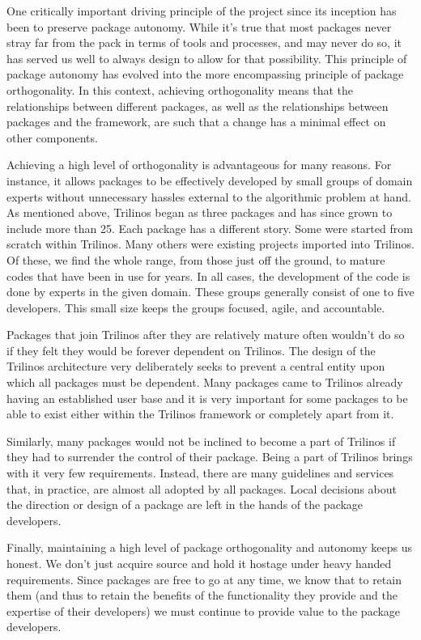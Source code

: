 \documentclass[12pt,relax]{article}
\begin{document}
One critically important driving principle of the project since its inception
has been to preserve package
autonomy.  While it's true that most packages never stray far from the
pack in terms of tools and processes, and may never do so, it has served us 
well to always design to allow for that possibility.
This principle of package autonomy has evolved into the more
encompassing principle of package orthogonality.   In this context, 
achieving orthogonality means that the 
relationships between different packages, as well as the relationships
between packages and the framework, are such that a change has
a minimal effect on other components.

Achieving a high level of orthogonality is advantageous for many reasons.  For 
instance, it allows packages to be effectively developed by small groups of 
domain experts without unnecessary hassles external to the algorithmic problem 
at hand.  As mentioned above, Trilinos began as three packages and has since
grown to include more than 25.  Each package has a different story.  
Some were started from scratch within Trilinos.  Many others were existing
projects imported into Trilinos.  Of these, we find the whole range, from
those just off the ground, to mature codes that have been in use for years.
In all cases, the development of the code is done by experts in the given
domain.  These groups generally consist of one to five developers.  This
small size keeps the groups focused, agile, and accountable.
  
Packages that join Trilinos after they are relatively mature often wouldn't
do so if they felt they would be forever dependent on Trilinos.  The design
of the Trilinos architecture very deliberately seeks to prevent a central
entity upon which all packages must be dependent.  Many packages came to 
Trilinos already having an established user base and it is very important
for some packages to be able to exist either within the Trilinos framework
or completely apart from it.

Similarly, many packages would not be inclined to become a part of Trilinos
if they had to surrender the control of their package.  Being a part of
Trilinos brings with it very few requirements.  Instead, there are many
guidelines and services that, in practice, are almost all adopted by all
packages.  Local decisions about the direction or design of a package are
left in the hands of the package developers.

Finally, maintaining a high level of package orthogonality and autonomy
keeps us honest.  We don't just acquire source and hold it hostage under heavy
handed requirements.  Since packages are free to go at any time, we know that
to retain them (and thus to retain the benefits of the functionality they
provide and the expertise of their developers) we must continue to provide
value to the package developers.
\end{document}
